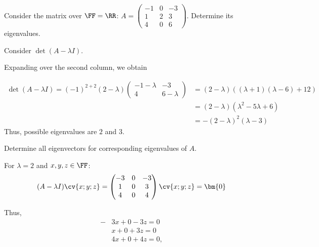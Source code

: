 \documentclass[11pt]{scrartcl}
\begin{document}
\begin{linenumbers}
  \begin{problem*}
    Consider the matrix over $\FF = \RR$:
    $A = \begin{pmatrix}
      -1 & 0 & -3 \\
      1  & 2 & 3  \\
      4  & 0 & 6
    \end{pmatrix}$. Determine its eigenvalues.
  \end{problem*}

  \begin{soln}

    Consider $\det \left( A - \lambda I \right)$.

    Expanding over the second column, we obtain

    \begin{align*}
      \det \left( A - \lambda I \right) = (-1)^{2+2}(2-\lambda)
      \begin{pmatrix}
        -1-\lambda & -3                                        \\
        4          & 6-\lambda
      \end{pmatrix}
                   & = (2-\lambda)((\lambda+1)(\lambda-6)+12)  \\
                   & = (2-\lambda)(\lambda^{2} - 5 \lambda +6) \\
                   & = -(2-\lambda)^2 (\lambda-3)
    \end{align*}
    Thus, possible eigenvalues are $2$ and $3$.
  \end{soln}
  \begin{problem*}
    Determine all eigenvectors for
    corresponding eigenvalues of $A$.
  \end{problem*}
  \begin{soln}
    For $\lambda =2$ and $x, y, z \in \FF$:
    \begin{equation*}
      (A-\lambda I) \cv{x; y; z}=
      \begin{pmatrix}
        -3          & 0 & -3 \\
        1          & 0 & 3  \\
        4          & 0 & 4
      \end{pmatrix} \cv{x; y; z} = \bm{0}
    \end{equation*}

    Thus, \begin{align}
            -&3x  + 0  - 3z  = 0 \\
            & x  + 0 + 3z = 0     \\
            & 4x + 0 + 4z = 0,
          \end{align}


\end{soln}
\end{linenumbers}
\end{document}
